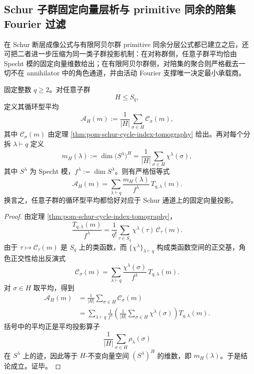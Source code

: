 \subsection{Schur 子群固定向量层析与 primitive 同余的陪集 Fourier 过滤}\label{subsec:conclusion-schur-subgroup-coset-fourier-tomography}
在 Schur 断层成像公式与有限阿贝尔群 primitive 同余分层公式都已建立之后，还可把二者进一步压缩为同一类子群投影机制：在对称群侧，任意子群平均恰由 Specht 模的固定向量维数给出；在有限阿贝尔群侧，对陪集的聚合则严格截去一切不在 annihilator 中的角色通道，并由活动 Fourier 支撑唯一决定最小承载商。

\begin{theorem}\label{thm:conclusion-schur-subgroup-average-fixed-vector-tomography}
固定整数 \(q\ge 2\)。对任意子群
\[
H\le S_q,
\]
定义其循环型平均
\[
\mathcal A_H(m):=\frac{1}{|H|}\sum_{\sigma\in H}\mathcal C_\sigma(m),
\]
其中 \(\mathcal C_\sigma(m)\) 由定理 \ref{thm:pom-schur-cycle-index-tomography} 给出。再对每个分拆 \(\lambda\vdash q\) 定义
\[
m_H(\lambda)
:=
\dim\bigl(S^\lambda\bigr)^H
=
\frac{1}{|H|}\sum_{\sigma\in H}\chi^\lambda(\sigma),
\]
其中 \(S^\lambda\) 为 Specht 模，\(f^\lambda:=\dim S^\lambda\)。则有严格恒等式
\[
\boxed{\;
\mathcal A_H(m)
=
\sum_{\lambda\vdash q}
\frac{m_H(\lambda)}{f^\lambda}\,T_{q,\lambda}(m).\;}
\]
换言之，任意子群的循环型平均都恰好对应于 Schur 通道上的固定向量投影。
\end{theorem}
\begin{proof}
由定理 \ref{thm:pom-schur-cycle-index-tomography}，
\[
\frac{T_{q,\lambda}(m)}{f^\lambda}
=
\frac{1}{q!}\sum_{\tau\in S_q}\chi^\lambda(\tau)\,\mathcal C_\tau(m).
\]
由于 \(\tau\mapsto \mathcal C_\tau(m)\) 是 \(S_q\) 上的类函数，而 \(\{\chi^\lambda\}_{\lambda\vdash q}\) 构成类函数空间的正交基，角色正交性给出反演式
\[
\mathcal C_\sigma(m)
=
\sum_{\lambda\vdash q}
\frac{\chi^\lambda(\sigma)}{f^\lambda}\,T_{q,\lambda}(m).
\]
对 \(\sigma\in H\) 取平均，得到
\[
\begin{aligned}
\mathcal A_H(m)
&=
\frac{1}{|H|}\sum_{\sigma\in H}\mathcal C_\sigma(m)\\
&=
\sum_{\lambda\vdash q}
\frac{1}{f^\lambda}
\left(
\frac{1}{|H|}\sum_{\sigma\in H}\chi^\lambda(\sigma)
\right)
T_{q,\lambda}(m).
\end{aligned}
\]
括号中的平均正是平均投影算子
\[
\frac{1}{|H|}\sum_{\sigma\in H}\rho_\lambda(\sigma)
\]
在 \(S^\lambda\) 上的迹，因此等于 \(H\)-不变向量空间 \((S^\lambda)^H\) 的维数，即 \(m_H(\lambda)\)。于是结论成立。证毕。
\end{proof}

